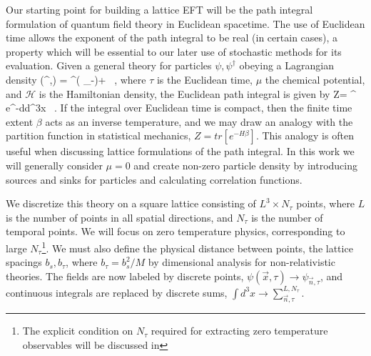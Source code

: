 Our starting point for building a lattice EFT will be the path integral formulation of quantum field theory in Euclidean spacetime. The use of Euclidean time allows the exponent of the path integral to be real (in certain cases), a property which will be essential to our later use of stochastic methods for its evaluation. Given a general theory for particles $\psi,\psi^{\dagger}$ obeying a Lagrangian density \beq 
{}(\psi^{\dagger},\psi) = \psi^{\dagger}\left( \partial_{\tau}-\mu \right)\psi+ \left[\psi^{\dagger}, \psi\right] \ ,
\eeq
where $\tau$ is the Euclidean time, $\mu$ the chemical potential, and $\mathcal{H}$ is the Hamiltonian density, the Euclidean path integral is given by
\beq
Z=\int {} \psi^{\dagger} \psi e^{-\int d\tau d^3x} \ .
\eeq
If the integral over Euclidean time is compact, then the finite time extent $\beta$ acts as an inverse temperature, and we may draw an analogy with the partition function in statistical mechanics, $Z = tr\left[e^{-H\beta}\right]$. This analogy is often useful when discussing lattice formulations of the path integral. In this work we will generally consider $\mu=0$ and create non-zero particle density by introducing sources and sinks for particles and calculating correlation functions. 

We discretize this theory on a square lattice consisting of $L^3 \times N_{\tau}$ points, where $L$ is the number of points in all spatial directions, and $N_{\tau}$ is the number of temporal points. We will focus on zero temperature physics, corresponding to large $N_{\tau}$\footnote{The explicit condition on $N_{\tau}$ required for extracting zero temperature observables will be discussed in }. We must also define the physical distance between points, the lattice spacings $b_s, b_{\tau}$, where $b_{\tau} = b_s^2/M$ by dimensional analysis for non-relativistic theories. The fields are now labeled by discrete points, $\psi(\vec{x},\tau) \to \psi_{\vec{n},\tau}$, and continuous integrals are replaced by discrete sums, $\int d^3x \to \sum_{\vec{n},\tau}^{L,N_{\tau}}$.

